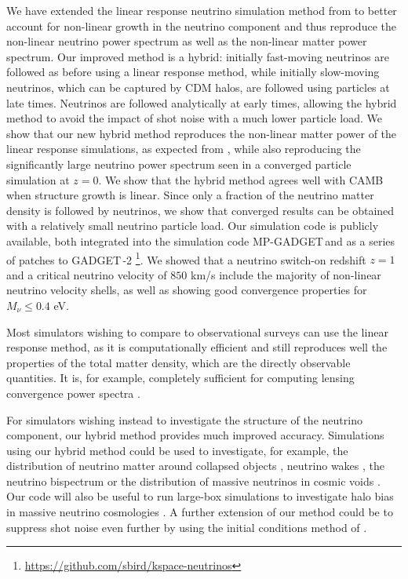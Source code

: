 \documentclass[useAMS, usenatbib]{mnras}
\newcommand{\gadget}{{\small GADGET\,}}
\begin{document}
We have extended the linear response neutrino simulation method from \cite{AHB} to better account for non-linear growth in the neutrino component and thus reproduce the non-linear neutrino power spectrum as well as the non-linear matter power spectrum.
Our improved method is a hybrid: initially fast-moving neutrinos are followed as before using a linear response method, while initially slow-moving neutrinos, which can be captured by CDM halos, are followed using particles at late times. Neutrinos are followed analytically at early times, allowing the hybrid method to avoid the impact of shot noise with a much lower particle load. We show that our new hybrid method reproduces the non-linear matter power of the linear response simulations, as expected from \cite{AHB}, while also reproducing the significantly large neutrino power spectrum seen in a converged particle simulation at $z=0$. We show that the hybrid method agrees well with CAMB when structure growth is linear. Since only a fraction of the neutrino matter density is followed by neutrinos, we show that converged results can be obtained with a relatively small neutrino particle load. Our simulation code is publicly available, both integrated into the simulation code MP-\gadget and as a series of patches to \gadget-2 \footnote{\url{https://github.com/sbird/kspace-neutrinos}}. We showed that a neutrino switch-on redshift $z=1$ and a critical neutrino velocity of $850$ km/s include the majority of non-linear neutrino velocity shells, as well as showing good convergence properties for $M_\nu \leq 0.4$ eV.

Most simulators wishing to compare to observational surveys can use the linear response method, as it is computationally efficient and still reproduces well the properties of the total matter density, which are the directly observable quantities. It is, for example, completely sufficient for computing lensing convergence power spectra \citep{McCarthy_2018, Liu_2017}.

For simulators wishing instead to investigate the structure of the neutrino component, our hybrid method provides much improved accuracy. Simulations using our hybrid method could be used to investigate, for example, the distribution of neutrino matter around collapsed objects \citep{FVN_2013}, neutrino wakes \citep{Inman_2015}, the neutrino bispectrum \citep{Furhrer_2015, Ruggeri_18} or the distribution of massive neutrinos in cosmic voids \citep{Banerjee_2016}. Our code will also be useful to run large-box simulations to investigate halo bias in massive neutrino cosmologies \citep{Loverde_14, Chiang_17}. A further extension of our method could be to suppress shot noise even further by using the initial conditions method of \cite{Banerjee_2018}.
\end{document}

